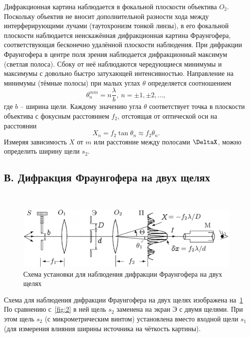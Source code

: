 \documentclass[12pt]{article}
\begin{document}
    Дифракционная картина наблюдается в фокальной плоскости объектива $O_2$.
    Поскольку объектив не вносит дополнительной разности хода между интерферирующими лучами
    (таутохронизм тонкой линзы), в его фокальной плоскости наблюдается неискажённая
    дифракционная картина Фраунгофера, соответствующая бесконечно удалённой плоскости наблюдения.
    При дифракции Фраунгофера в центре поля зрения наблюдается дифракционный максимум (светлая полоса).
    Сбоку от неё наблюдаются чередующиеся минимумы и максимумы с довольно быстро затухающей интенсивностью.
    Направление на минимумы (тёмные полосы) при малых углах $\theta$ определяется соотношением
    \begin{equation}
        \theta^{min}_n=n\frac{\lambda}{b},\ n=\pm1,\pm2,\dots,
        \label{eq:2}
    \end{equation}
    где $b$ -- ширина щели.
    Каждому значению угла $\theta$ соответствует точка в плоскости объектива с фокусным расстоянием $f_2$,
    отстоящая от оптической оси на расстоянии
    \begin{equation}
        X_n = f_2 \tan \theta_n \approx f_2 \theta_n.
        \label{eq:3}
    \end{equation}
    Измеряя зависимость $X$ от $m$ или расстояние между полосами $\DeltaX$, можно определить
    ширину щели $s_2$.

    \subsection*{В. Дифракция Фраунгофера на двух щелях}
    \ \par
    \begin{figure}[h]
        \centering
        \includegraphics[width=\linewidth]{pic/setupC}
        \caption{Схема установки для наблюдения дифракции Фраунгофера на двух щелях}
        \label{fig:3}
    \end{figure}
    Схема для наблюдения дифракции Фраунгофера на двух щелях изображена на\ \figurename{\ref{fig:3}}
    По сравнению с\ \figurename{\ref{fig:2}} в ней щель $s_2$ заменена на экран Э с двумя щелями.
    При этом щель $s_2$ (с микрометрическим винтом) установлена вместо входной щели $s_1$ (для измерения
    влияния ширины источника на чёткость картины).
\end{document}
